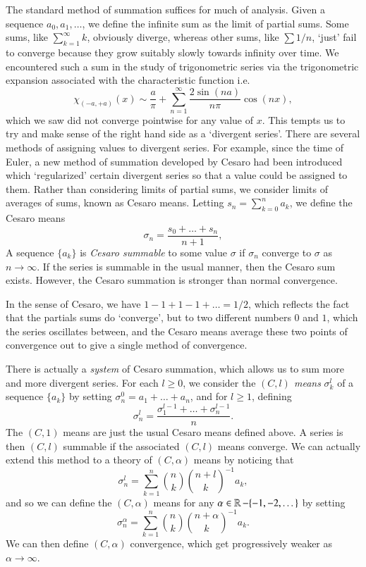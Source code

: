 The standard method of summation suffices for much of analysis. Given a sequence $a_0, a_1, \dots$, we define the infinite sum as the limit of partial sums. Some sums, like $\sum_{k = 1}^\infty k$, obviously diverge, whereas other sums, like $\sum 1/n$, `just' fail to converge because they grow suitably slowly towards infinity over time. We encountered such a sum in the study of trigonometric series via the trigonometric expansion associated with the characteristic function i.e.
%
\[ \chi_{(-a,+a)}(x) \sim \frac{a}{\pi} + \sum_{n = 1}^\infty \frac{2 \sin(n a)}{n \pi} \cos(nx), \]
%
which we saw did not converge pointwise for any value of $x$. This tempts us to try and make sense of the right hand side as a `divergent series'. There are several methods of assigning values to divergent series. For example, since the time of Euler, a new method of summation developed by Cesaro had been introduced which `regularized' certain divergent series so that a value could be assigned to them. Rather than considering limits of partial sums, we consider limits of averages of sums, known as Cesaro means. Letting $s_n = \sum_{k = 0}^n a_k$, we define the Cesaro means
%
\[ \sigma_n = \frac{s_0 + \dots + s_n}{n+1}, \]
%
A sequence $\{ a_k \}$ is \emph{Cesaro summable} to some value $\sigma$ if $\sigma_n$ converge to $\sigma$ as $n \to \infty$. If the series is summable in the usual manner, then the Cesaro sum exists. However, the Cesaro summation is stronger than normal convergence.

\begin{example}
In the sense of Cesaro, we have $1 - 1 + 1 - 1 + \dots = 1/2$, which reflects the fact that the partials sums do `converge', but to two different numbers $0$ and $1$, which the series oscillates between, and the Cesaro means average these two points of convergence out to give a single method of convergence.
\end{example}

There is actually a \emph{system} of Cesaro summation, which allows us to sum more and more divergent series. For each $l \geq 0$, we consider the \emph{$(C,l)$ means} $\sigma^l_k$ of a sequence $\{ a_k \}$ by setting $\sigma^0_n = a_1 + \dots + a_n$, and for $l \geq 1$, defining
%
\[ \sigma^l_n = \frac{\sigma^{l-1}_1 + \dots + \sigma^{l-1}_n}{n}. \]
%
The $(C,1)$ means are just the usual Cesaro means defined above. A series is then $(C,l)$ summable if the associated $(C,l)$ means converge. We can actually extend this method to a theory of $(C,\alpha)$ means by noticing that
%
\[ \sigma^l_n = \sum_{k = 1}^n \binom{n}{k} \binom{n + l}{k}^{-1} a_k, \]
%
and so we can define the $(C,\alpha)$ means for any $\alpha \in \operatorname{\mathbb{R}} - \{ -1, -2, \dots \}$ by setting
%
\[ \sigma^\alpha_n = \sum_{k = 1}^n \binom{n}{k} \binom{n + \alpha}{k}^{-1} a_k. \]
%
We can then define $(C,\alpha)$ convergence, which get progressively weaker as $\alpha \to \infty$.


